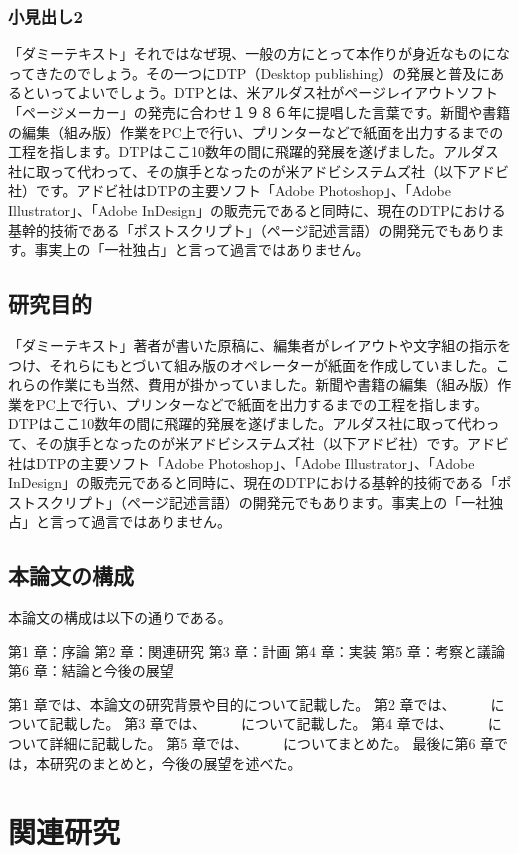 \documentclass{cuxarticle}
\begin{document}
\subsection{小見出し2}
「ダミーテキスト」それではなぜ現、一般の方にとって本作りが身近なものになってきたのでしょう。その一つにDTP（Desktop publishing）の発展と普及にあるといってよいでしょう。DTPとは、米アルダス社がページレイアウトソフト「ページメーカー」の発売に合わせ１９８６年に提唱した言葉です。新聞や書籍の編集（組み版）作業をPC上で行い、プリンターなどで紙面を出力するまでの工程を指します。DTPはここ10数年の間に飛躍的発展を遂げました。アルダス社に取って代わって、その旗手となったのが米アドビシステムズ社（以下アドビ社）です。アドビ社はDTPの主要ソフト「Adobe Photoshop」、「Adobe Illustrator」、「Adobe InDesign」の販売元であると同時に、現在のDTPにおける基幹的技術である「ポストスクリプト」（ページ記述言語）の開発元でもあります。事実上の「一社独占」と言って過言ではありません。

\section{研究目的}
「ダミーテキスト」著者が書いた原稿に、編集者がレイアウトや文字組の指示をつけ、それらにもとづいて組み版のオペレーターが紙面を作成していました。これらの作業にも当然、費用が掛かっていました。新聞や書籍の編集（組み版）作業をPC上で行い、プリンターなどで紙面を出力するまでの工程を指します。DTPはここ10数年の間に飛躍的発展を遂げました。アルダス社に取って代わって、その旗手となったのが米アドビシステムズ社（以下アドビ社）です。アドビ社はDTPの主要ソフト「Adobe Photoshop」、「Adobe Illustrator」、「Adobe InDesign」の販売元であると同時に、現在のDTPにおける基幹的技術である「ポストスクリプト」（ページ記述言語）の開発元でもあります。事実上の「一社独占」と言って過言ではありません。

\section{本論文の構成}
本論文の構成は以下の通りである。

第1 章：序論
第2 章：関連研究
第3 章：計画
第4 章：実装
第5 章：考察と議論
第6 章：結論と今後の展望

第1 章では、本論文の研究背景や目的について記載した。
第2 章では、　　　について記載した。
第3 章では、　　　について記載した。
第4 章では、　　　について詳細に記載した。
第5 章では、　　　についてまとめた。
最後に第6 章では，本研究のまとめと，今後の展望を述べた。

\chapter{関連研究}
\end{document}
